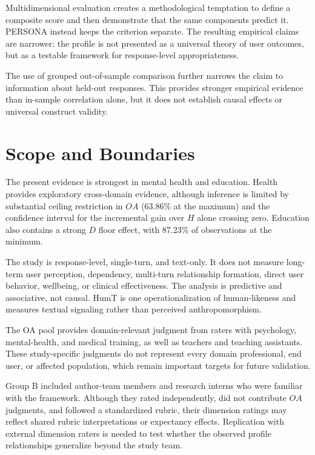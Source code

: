\documentclass[manuscript,review,anonymous]{acmart}
\begin{document}
Multidimensional evaluation creates a methodological temptation to define a composite score and then demonstrate that the same components predict it. PERSONA instead keeps the criterion separate. The resulting empirical claims are narrower: the profile is not presented as a universal theory of user outcomes, but as a testable framework for response-level appropriateness.

The use of grouped out-of-sample comparison further narrows the claim to information about held-out responses. This provides stronger empirical evidence than in-sample correlation alone, but it does not establish causal effects or universal construct validity.

\section{Scope and Boundaries}

The present evidence is strongest in mental health and education. Health provides exploratory cross-domain evidence, although inference is limited by substantial ceiling restriction in $OA$ (63.86\% at the maximum) and the confidence interval for the incremental gain over $H$ alone crossing zero. Education also contains a strong $D$ floor effect, with 87.23\% of observations at the minimum.

The study is response-level, single-turn, and text-only. It does not measure long-term user perception, dependency, multi-turn relationship formation, direct user behavior, wellbeing, or clinical effectiveness. The analysis is predictive and associative, not causal. HumT is one operationalization of human-likeness and measures textual signaling rather than perceived anthropomorphism.

The OA pool provides domain-relevant judgment from raters with psychology, mental-health, and medical training, as well as teachers and teaching assistants. These study-specific judgments do not represent every domain professional, end user, or affected population, which remain important targets for future validation.

Group B included author-team members and research interns who were familiar with the framework. Although they rated independently, did not contribute $OA$ judgments, and followed a standardized rubric, their dimension ratings may reflect shared rubric interpretations or expectancy effects. Replication with external dimension raters is needed to test whether the observed profile relationships generalize beyond the study team.
\end{document}
